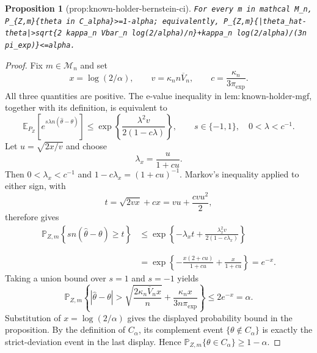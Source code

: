 \documentclass{article}
\newtheorem{proposition}{Proposition}
\begin{document}
\begin{proposition}[prop:known-holder-bernstein-ci]\label{prop:known-holder-bernstein-ci}
\texttt{For every m in mathcal M\_n, P\_\{Z,m\}\{theta in C\_alpha\}>=1-alpha; equivalently, P\_\{Z,m\}\{|theta\_hat-theta|>sqrt\{2 kappa\_n Vbar\_n log(2/alpha)/n\}+kappa\_n log(2/alpha)/(3n pi\_exp)\}<=alpha.}
\end{proposition}
\begin{proof}
Fix \(m\in\mathcal M_n\) and set
\[
x=\log(2/\alpha),\qquad
v=\kappa_n n\overline V_n,
\qquad c=\frac{\kappa_n}{3\pi_{\exp}}.
\]
All three quantities are positive. The e-value inequality in \(\mathrm{lem{:}known\mbox{-}holder\mbox{-}mgf}\), together with its definition, is equivalent to
\[
\mathbb E_{P_Z}\!\left[
e^{s\lambda n(\widehat\theta-\theta)}
\right]
\le \exp\left\{\frac{\lambda^2v}{2(1-c\lambda)}\right\},
\qquad s\in\{-1,1\},\quad 0<\lambda<c^{-1}.
\]
Let \(u=\sqrt{2x/v}\) and choose
\[
\lambda_x=\frac{u}{1+cu}.
\]
Then \(0<\lambda_x<c^{-1}\) and \(1-c\lambda_x=(1+cu)^{-1}\). Markov's inequality applied to either sign, with
\[
t=\sqrt{2vx}+cx=vu+\frac{cvu^2}{2},
\]
therefore gives
\[
\begin{aligned}
\mathbb P_{Z,m}\!\left\{s n(\widehat\theta-\theta)\ge t\right\}
&\le
\exp\left\{-\lambda_xt+
\frac{\lambda_x^2v}{2(1-c\lambda_x)}\right\}\\\\\\
&=\exp\left\{-\frac{x(2+cu)}{1+cu}
+\frac{x}{1+cu}\right\}
=e^{-x}.
\end{aligned}
\]
Taking a union bound over \(s=1\) and \(s=-1\) yields
\[
\mathbb P_{Z,m}\!\left\{
|\widehat\theta-\theta|>
\sqrt{\frac{2\kappa_n\overline V_n x}{n}}
+\frac{\kappa_n x}{3n\pi_{\exp}}
\right\}
\le 2e^{-x}=\alpha.
\]
Substitution of \(x=\log(2/\alpha)\) gives the displayed probability bound in the proposition. By the definition of \(C_\alpha\), its complement event \(\{\theta\notin C_\alpha\}\) is exactly the strict-deviation event in the last display. Hence \(\mathbb P_{Z,m}\{\theta\in C_\alpha\}\ge1-\alpha\).
\end{proof}
\end{document}
